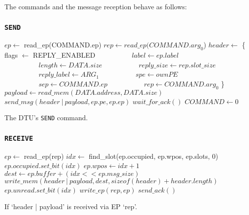 \documentclass[a4paper,11pt,draft]{article}
\begin{document}
\noindent The commands and the message reception behave as follows:

\subsubsection{\texttt{SEND}}

\begin{algorithm}[H]
    $ep \gets$ read\_ep(COMMAND.ep)\;
    \BlankLine
    $rep \gets read\_ep(COMMAND.arg_0$)\;
    $header \gets$ \{ flags $\gets$ REPLY\_ENABLED\;
    $\quad\quad\quad\quad\quad label \gets ep.label$\;
    $\quad\quad\quad\quad\quad length \gets DATA.size$\;
    $\quad\quad\quad\quad\quad reply\_size \gets rep.slot\_size$\;
    $\quad\quad\quad\quad\quad reply\_label \gets ARG_1$\;
    $\quad\quad\quad\quad\quad spe \gets ownPE$\;
    $\quad\quad\quad\quad\quad sep \gets COMMAND.ep$\;
    $\quad\quad\quad\quad\quad rep \gets COMMAND.arg_0$ \}\;
    $payload \gets read\_mem(DATA.address, DATA.size)$\;
    $send\_msg(header\ |\ payload, ep.pe, ep.ep)$\;
    $wait\_for\_ack()$\;
    \BlankLine
    $COMMAND \gets 0$\;
    \caption{The DTU's \texttt{SEND} command.}
\end{algorithm}

\subsubsection{\texttt{RECEIVE}}

\begin{algorithm}[H]
    $ep \gets$ read\_ep(rep)\;
    \BlankLine
    $idx \gets$ find\_slot(ep.occupied, ep.wpos, ep.slots, 0)\;
    $ep.occupied.set\_bit(idx)$\;
    $ep.wpos \gets idx + 1$\;
    \BlankLine
    $dest \gets ep.buffer + (idx << ep.msg\_size)$\;
    $write\_mem(header\ |\ payload, dest, sizeof(header) + header.length)$\;
    $ep.unread.set\_bit(idx)$\;
    $write\_ep(rep, ep)$\;
    \BlankLine
    \BlankLine
    $send\_ack()$\;
    \caption{If `header | payload' is received via EP `rep'.}
\end{algorithm}
\end{document}
